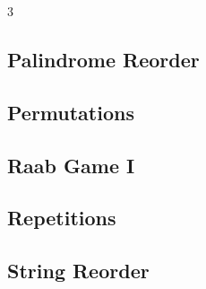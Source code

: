 \documentclass[8pt]{extarticle}
\begin{document}
\begin{multicols*}{3}
\subsection{Palindrome Reorder}
\begin{caixaenunciado}

\end{caixaenunciado}
\vspace{0.3cm}


\subsection{Permutations}
\begin{caixaenunciado}

\end{caixaenunciado}
\vspace{0.3cm}


\subsection{Raab Game I}
\begin{caixaenunciado}

\end{caixaenunciado}
\vspace{0.3cm}


\subsection{Repetitions}
\begin{caixaenunciado}

\end{caixaenunciado}
\vspace{0.3cm}


\subsection{String Reorder}
\begin{caixaenunciado}

\end{caixaenunciado}
\vspace{0.3cm}



\end{multicols*}
\end{document}
